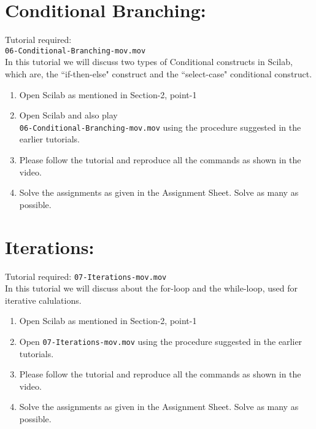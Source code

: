 \documentclass[11pt]{article}
\newenvironment{enumcpt}{\begin{enumerate} \topsep 0pt \partopsep 0pt 
                        \parsep 0pt
                        \itemsep 0pt \leftmargin -1in \rightmargin 0pt
                        }{\end{enumerate}}
\begin{document}
\begin{multicols}{2}
\section{Conditional Branching:}
Tutorial required: \\ {\tt 06-Conditional-Branching-mov.mov} \\In this tutorial we will discuss two types of Conditional constructs in Scilab, which are, the ``if-then-else" construct and the ``select-case" conditional construct. 

\begin{enumcpt}
\item Open Scilab as mentioned in Section-2, point-1
\item Open Scilab and also play \\
{\tt 06-Conditional-Branching-mov.mov} using the procedure suggested in the
earlier tutorials.
\item Please follow the tutorial and reproduce all the commands as
  shown in the video.
\item Solve the assignments as given in the Assignment Sheet.  Solve as many as possible.
\end{enumcpt}

\section{Iterations:}
Tutorial required: {\tt 07-Iterations-mov.mov} \\ 
In this tutorial we will discuss about the for-loop and the while-loop, used for iterative calulations.
\begin{enumcpt}
\item Open Scilab as mentioned in Section-2, point-1
\item Open {\tt 07-Iterations-mov.mov} using the procedure suggested in the
earlier tutorials.
\item Please follow the tutorial and reproduce all the commands as
  shown in the video.
\item Solve the assignments as given in the Assignment Sheet.  Solve as many as possible.
\end{enumcpt}


\end{multicols}
\end{document}
